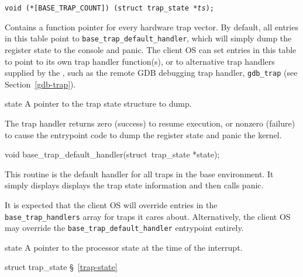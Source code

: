 \label{base-trap-handlers}
\begin{apisyn}

	{\tt void (*[BASE_TRAP_COUNT])
		(struct~trap_state *\emph{ts});}
\end{apisyn}
\begin{apidesc}
	Contains a function pointer for every hardware trap vector.
	By default, all entries in this table point to
	{\tt base_trap_default_handler}, which will simply
	dump the register state to the console and panic.
	The client OS can set entries in this table
	to point to its own trap handler function(s),
	or to alternative trap handlers supplied by the \oskit{},
	such as the remote GDB debugging trap handler, {\tt gdb_trap}
	(see Section~\ref{gdb-trap}).
\end{apidesc}
\begin{apiparm}
	\item[state]
		A pointer to the trap state structure to dump.
\end{apiparm}
\begin{apiret}
	The trap handler returns zero (success) to resume execution,
	or nonzero (failure) to cause the entrypoint code
	to dump the register state and panic the kernel.
\end{apiret}

\label{base-trap-default-handler}
\begin{apisyn}

	\funcproto void base_trap_default_handler(struct~trap_state *state);
\end{apisyn}
\begin{apidesc}
	This routine is the default handler for all traps in the base
	environment.  It simply displays displays the trap state
	information and then calls panic.

	It is expected that the client OS will override entries in the {\tt
	base_trap_handlers} array for traps it cares about. Alternatively,
	the client OS may override the {\tt base_trap_default_handler}
	entrypoint entirely.
\end{apidesc}
\begin{apiparm}
	\item[state]
		A pointer to the processor state at the time of the interrupt.
\end{apiparm}
\begin{apidep}
	\item[struct trap_state]	\S~\ref{trap-state}
\end{apidep}

